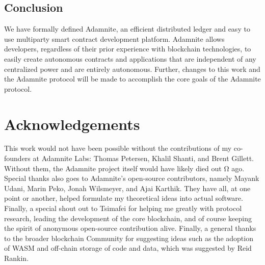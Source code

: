 \documentclass[conference]{IEEEtran}
\begin{document}
\subsection{Conclusion}
We have formally defined Adamnite, an efficient distributed ledger and easy to use multiparty smart contract development platform. Adamnite allows developers, regardless of their prior experience with blockchain technologies, to easily create autonomous contracts and applications that are independent of any centralized power and are entirely autonomous. Further, changes to this work and the Adamnite protocol will be made to accomplish the core goals of the Adamnite protocol. 
\section{Acknowledgements}
This work would not have been possible without the contributions of my co-founders at Adamnite Labs: Thomas Petersen, Khalil Shanti, and Brent Gillett. Without them, the Adamnite project itself would have likely died out Ω ago. Special thanks also goes to Adamnite's open-source contributors, namely Mayank Udani, Marin Peko, Jonah Wilsmeyer, and Ajai Karthik. They have all, at one point or another, helped formulate my theoretical ideas into actual software. Finally, a special shout out to Tsimafei for helping me greatly with protocol research, leading the development of the core blockchain, and of course keeping the spirit of anonymous open-source contribution alive. Finally, a general thanks to the broader blockchain Community for suggesting ideas such as the adoption of WASM and off-chain storage of code and data, which was suggested by Reid Rankin.
\end{document}
